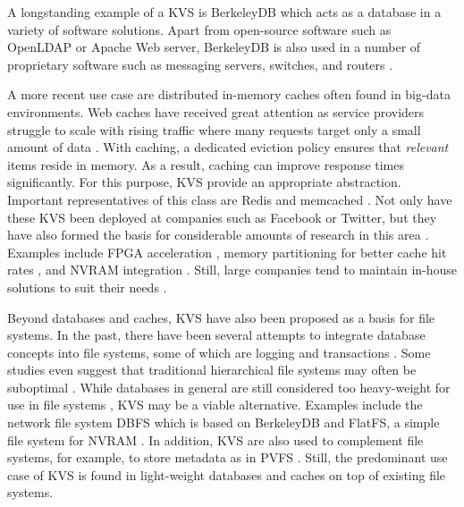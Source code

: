 A longstanding example of a \ac{KVS} is BerkeleyDB which acts as a database in a
variety of software solutions. Apart from open-source software such as OpenLDAP
or Apache Web server, BerkeleyDB is also used in a number of proprietary
software such as messaging servers, switches, and routers
\cite{kaestner2007aspect, olson1999berkeley}.

A more recent use case are distributed in-memory caches often found in big-data
environments. Web caches have received great attention as service providers
struggle to scale with rising traffic where many requests target only a small
amount of data \cite{xu2014characterizing}. With caching, a dedicated eviction
policy ensures that \emph{relevant} items reside in memory. As a result, caching
can improve response times significantly. For this purpose, \ac{KVS} provide an
appropriate abstraction. Important representatives of this class are Redis and
memcached \cite{redis2017home, memcached2017home}. Not only have these \ac{KVS}
been deployed at companies such as Facebook or Twitter, but they have also
formed the basis for considerable amounts of research in this area
\cite{xu2014characterizing}. Examples include \ac{FPGA} acceleration
\cite{lavasani2014fpga}, memory partitioning for better cache hit rates
\cite{carra2014memory}, and \ac{NVRAM} integration \cite{wu2016nvmcached,
malinowski2017using, venkataraman2011consistent}. Still, large companies tend to
maintain in-house solutions to suit their needs \cite{chang2008bigtable,
decandia2007dynamo, lakshman2010cassandra, wang2015hydradb}.

Beyond databases and caches, \ac{KVS} have also been proposed as a basis for
file systems. In the past, there have been several attempts to integrate
database concepts into file systems, some of which are logging
\cite{rosenblum1992design, tweedie1998journaling} and transactions
\cite{seltzer1990transaction, wright2007extending, spillane2009enabling}. Some
studies even suggest that traditional hierarchical file systems may often be
suboptimal \cite{stein2005stupid, seltzer2009hierarchical}. While databases in
general are still considered too heavy-weight for use in file systems
\cite{seltzer2009hierarchical}, \ac{KVS} may be a viable alternative. Examples
include the network file system DBFS which is based on BerkeleyDB
\cite{murphy2002design} and FlatFS, a simple file system for \ac{NVRAM}
\cite{volos2014aerie}. In addition, \ac{KVS} are also used to complement file
systems, for example, to store metadata as in PVFS \cite{carns2009small}. Still,
the predominant use case of \ac{KVS} is found in light-weight databases and
caches on top of existing file systems.

